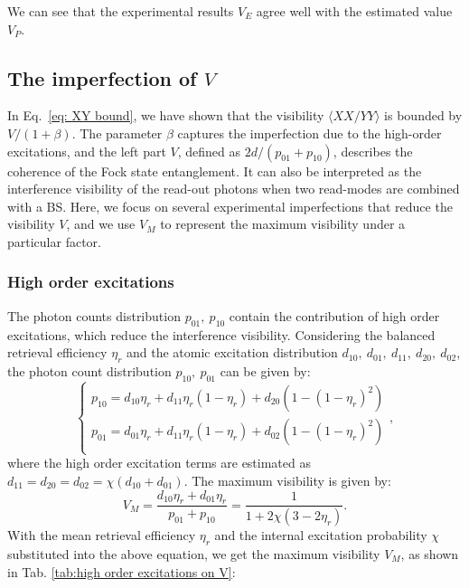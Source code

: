 \documentclass[aps,reprint,showpacs,superscriptaddress]{revtex4-2}
\begin{document}
We can see that the experimental results $V_E$ agree well with the estimated value $V_P$.

 \subsection{The imperfection of $V$}
In Eq.~\ref{eq: XY bound}, we have shown that the visibility $\langle XX/YY \rangle$ is bounded by $V/(1+\beta)$.
The parameter $\beta$ captures the imperfection due to the high-order excitations, and the left part $V$, defined as $2d/(p_{01}+p_{10})$, describes the coherence of the Fock state entanglement. It can also be interpreted as the interference visibility of the read-out photons when two read-modes are combined with a BS. Here, we focus on several experimental imperfections that reduce the visibility $V$, and we use $V_M$ to represent the maximum visibility under a particular factor.

\subsubsection{High order excitations}

The photon counts distribution $p_{01},\ p_{10}$ contain the contribution of high order excitations, which reduce the interference visibility.  Considering the balanced retrieval efficiency $\eta_r$  and the atomic excitation distribution $d_{10},\ d_{01},\ d_{11},\ d_{20},\ d_{02}$,  the photon count distribution $p_{10},\ p_{01}$ can be given by:
\begin{equation}
	\begin{cases}
		p_{10}=d_{10}\eta_r+d_{11}\eta_r(1-\eta_r)+d_{20}(1-(1-\eta_r)^2)\\
		p_{01}=d_{01}\eta_r+d_{11}\eta_r(1-\eta_r)+d_{02}(1-(1-\eta_r)^2)\\
	\end{cases},
\end{equation}
where the high order excitation terms are estimated as $d_{11}=d_{20}=d_{02}=\chi(d_{10}+d_{01})$. The maximum visibility is given by:
\begin{equation}
	V_M=\frac{d_{10}\eta_r+d_{01}\eta_r}{p_{01}+p_{10}}=\frac{1}{1+2\chi(3-2\eta_r)}.
\end{equation}
With the mean retrieval efficiency $\eta_r$ and the internal excitation probability $\chi$ substituted into the above equation, we get the maximum visibility $V_M$, as shown in Tab. \ref{tab:high order excitations on V}:
\end{document}
